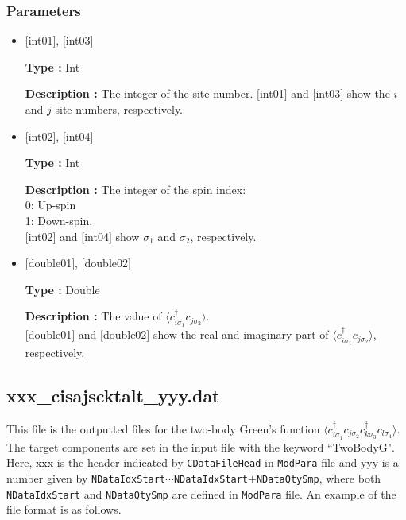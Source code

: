 \subsubsection{Parameters}
 \begin{itemize}

  \item  $[$int01$]$, $[$int03$]$

 {\bf Type :} Int

{\bf Description :} The integer of the site number. $[$int01$]$ and $[$int03$]$ show the $i$ and $j$ site numbers, respectively.
 
  \item  $[$int02$]$, $[$int04$]$

 {\bf Type :} Int 

{\bf Description :} The integer of the spin index:\\
   0: Up-spin\\
   1: Down-spin.\\ 
$[$int02$]$ and $[$int04$]$ show $\sigma_1$ and $\sigma_2$, respectively. \\

  \item  $[$double01$]$, $[$double02$]$

 {\bf Type :} Double 

{\bf Description :} The value of $\langle c_{i\sigma_1}^{\dagger}c_{j\sigma_2}\rangle$.\\
$[$double01$]$ and $[$double02$]$ show the real and imaginary part of $\langle c_{i\sigma_1}^{\dagger}c_{j\sigma_2}\rangle$, respectively.
\end{itemize}

\subsection{xxx\_cisajscktalt\_yyy.dat }
This file is the outputted files for the two-body Green's function $\langle c_{i\sigma_1}^{\dagger}c_{j\sigma_2}c_{k\sigma_3}^{\dagger}c_{l\sigma_4}\rangle$. 
The target components are set in the input file with the keyword ``TwoBodyG". Here, xxx is the header indicated by \verb|CDataFileHead| in \verb|ModPara| file and yyy is a number given by \verb|NDataIdxStart|$\cdots$\verb|NDataIdxStart|+\verb|NDataQtySmp|, where both \verb|NDataIdxStart| and \verb|NDataQtySmp| are defined in \verb|ModPara| file. An example of the file format is as follows.

